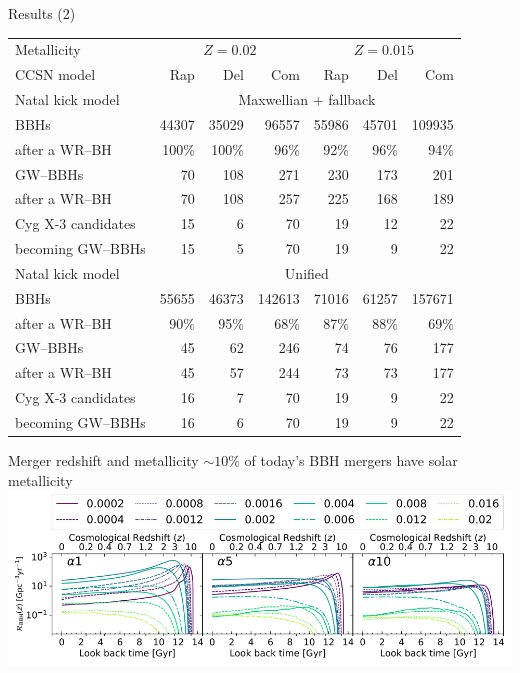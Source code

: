 \documentclass{beamer} %
\begin{document}
\begin{frame}[noframenumbering]{Results (2)}
	\scriptsize
		\begin{tabular}{l rrr>{\hspace{1.5pc}}rrr}
		\toprule
		Metallicity & \multicolumn{3}{c}{$Z=0.02$} & \multicolumn{3}{c}{$Z=0.015$}  \\
		CCSN model & Rap & Del & Com &  Rap & Del & Com\\
		\toprule
		Natal kick model & \multicolumn{6}{c}{Maxwellian + fallback}\\
		\toprule
		BBHs                      		& 44307 & 35029 & 96557 & 55986 & 45701 & 109935 \\
		after a WR--BH			& 100\% & 100\% & 96\% & 92\% & 96\% & 94\% \\
		\hline
		GW--BBHs  						& 70 & 108 & 271 & 230 & 173 & 201 \\
		after a WR--BH			& 70 & 108 & 257 & 225 & 168 & 189 \\
		\hline
		Cyg X-3 candidates  	 		& 15 & 6 & 70 & 19 & 12 & 22 \\
		becoming GW--BBHs   		 	& 15 & 5 & 70 & 19 & 9 & 22 \\
		\bottomrule 	
		\toprule
		Natal kick model & \multicolumn{6}{c}{Unified}
		\\
		\toprule
		BBHs  		& 55655 & 46373 & 142613 & 71016 & 61257 & 157671 \\
		after a WR--BH	& 90\% & 95\% & 68\% & 87\% & 88\%& 69\% \\
		\hline
		GW--BBHs  		& 45 & 62 & 246 & 74 & 76 & 177 \\
		after a WR--BH	& 45 & 57 & 244 & 73 & 73 & 177 \\
		\hline
		Cyg X-3 candidates  	 & 16 & 7 & 70 & 19 & 9 & 22 \\
		becoming GW--BBHs   		 & 16 & 6 & 70 & 19 & 9 & 22 \\
		\bottomrule 	
	\end{tabular}%
\end{frame}




\begin{frame}[noframenumbering]{Merger redshift and metallicity }
\centering
$\sim 10\%$ of today's BBH mergers have solar metallicity\\
\bigskip
\bigskip
	\includegraphics[width=\textwidth]{./images/redshift.png}\\
\smallskip
{}
\end{frame}
\end{document}
